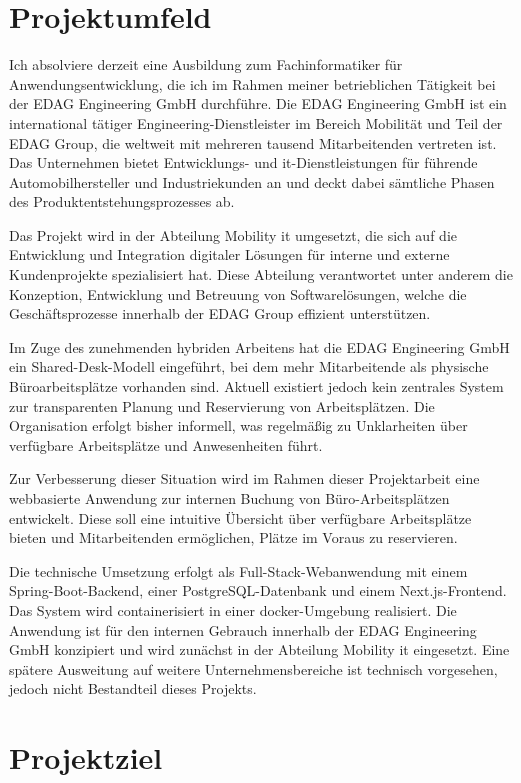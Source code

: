 \documentclass[11pt,a4paper]{report}
\begin{document}
\section{Projektumfeld}

Ich absolviere derzeit eine Ausbildung zum Fachinformatiker für Anwendungsentwicklung, die ich im Rahmen meiner betrieblichen Tätigkeit bei der EDAG Engineering GmbH durchführe. Die EDAG Engineering GmbH ist ein international tätiger Engineering-Dienstleister im Bereich Mobilität und Teil der EDAG Group, die weltweit mit mehreren tausend Mitarbeitenden vertreten ist. Das Unternehmen bietet Entwicklungs- und \gls{it}-Dienstleistungen für führende Automobilhersteller und Industriekunden an und deckt dabei sämtliche Phasen des Produktentstehungsprozesses ab.

Das Projekt wird in der Abteilung Mobility \gls{it} umgesetzt, die sich auf die Entwicklung und Integration digitaler Lösungen für interne und externe Kundenprojekte spezialisiert hat. Diese Abteilung verantwortet unter anderem die Konzeption, Entwicklung und Betreuung von Softwarelösungen, welche die Geschäftsprozesse innerhalb der EDAG Group effizient unterstützen.

Im Zuge des zunehmenden hybriden Arbeitens hat die EDAG Engineering GmbH ein Shared-Desk-Modell eingeführt, bei dem mehr Mitarbeitende als physische Büroarbeitsplätze vorhanden sind. Aktuell existiert jedoch kein zentrales System zur transparenten Planung und Reservierung von Arbeitsplätzen. Die Organisation erfolgt bisher informell, was regelmäßig zu Unklarheiten über verfügbare Arbeitsplätze und Anwesenheiten führt.

Zur Verbesserung dieser Situation wird im Rahmen dieser Projektarbeit eine webbasierte Anwendung zur internen Buchung von Büro-Arbeitsplätzen entwickelt. Diese soll eine intuitive Übersicht über verfügbare Arbeitsplätze bieten und Mitarbeitenden ermöglichen, Plätze im Voraus zu reservieren.

Die technische Umsetzung erfolgt als Full-Stack-Webanwendung mit einem Spring-Boot-Backend, einer PostgreSQL-Datenbank und einem Next.js-Frontend. Das System wird containerisiert in einer \gls{docker}-Umgebung realisiert. Die Anwendung ist für den internen Gebrauch innerhalb der EDAG Engineering GmbH konzipiert und wird zunächst in der Abteilung Mobility \gls{it} eingesetzt. Eine spätere Ausweitung auf weitere Unternehmensbereiche ist technisch vorgesehen, jedoch nicht Bestandteil dieses Projekts.

\section{Projektziel}
\end{document}
